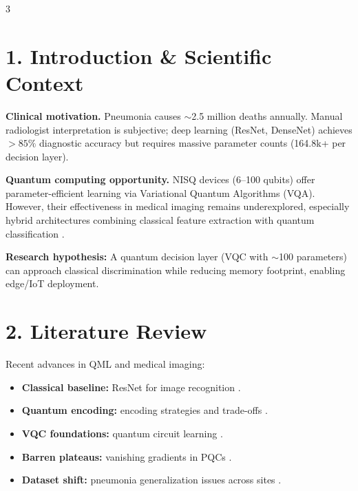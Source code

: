 \documentclass[a0,portrait]{a0poster}
\begin{document}
\begin{multicols}{3}


\color{UWBBlue}\section*{1. Introduction \& Scientific Context}
\color{TechGrey}

\noindent
\textbf{Clinical motivation.} Pneumonia causes \(\sim\)2.5 million deaths annually. Manual radiologist interpretation is subjective; deep learning (ResNet, DenseNet) achieves \(>85\%\) diagnostic accuracy but requires massive parameter counts (164.8k+ per decision layer). \vspace{0.25cm}

\textbf{Quantum computing opportunity.} NISQ devices (6--100 qubits) offer parameter-efficient learning via Variational Quantum Algorithms (VQA). However, their effectiveness in medical imaging remains underexplored, especially hybrid architectures combining classical feature extraction with quantum classification \cite{Schuld2018, Cerezo2021}. \vspace{0.25cm}

\begin{tcolorbox}
\textbf{\textcolor{NTCPurple}{Research hypothesis:}}
A quantum decision layer (VQC with \(\sim\)100 parameters) can approach classical discrimination while reducing memory footprint, enabling edge/IoT deployment.
\end{tcolorbox}


\color{UWBBlue}\section*{2. Literature Review}
\color{TechGrey}

\noindent
Recent advances in QML and medical imaging:

\begin{itemize}[leftmargin=0.9em,itemsep=0.15em,topsep=0.1em]
\item \textbf{Classical baseline:} ResNet for image recognition \cite{He2016}.
\item \textbf{Quantum encoding:} encoding strategies and trade-offs \cite{SharmaEnc2023}.
\item \textbf{VQC foundations:} quantum circuit learning \cite{Mitarai2018}.
\item \textbf{Barren plateaus:} vanishing gradients in PQCs \cite{McClean2018}.
\item \textbf{Dataset shift:} pneumonia generalization issues across sites \cite{Zech2018}.
\end{itemize}


\end{multicols}
\end{document}
